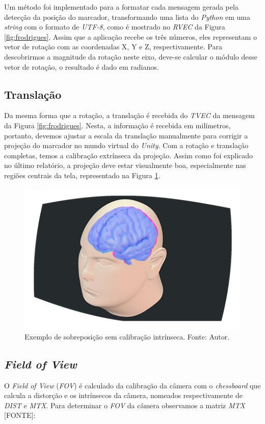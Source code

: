 Um método foi implementado para a formatar cada mensagem gerada pela detecção da posição do marcador, transformando uma lista do \textit{Python} em uma \textit{string} com o formato de \textit{UTF-8}, como é mostrado no \textit{RVEC} da Figura \ref{fig:frodrigues}. Assim que a aplicação recebe os três números, eles representam o vetor de rotação com as coordenadas X, Y e Z, respectivamente. Para descobrirmos a magnitude da rotação neste eixo, deve-se calcular o módulo desse vetor de rotação, o resultado é dado em radianos.

\subsection{Translação}

Da mesma forma que a rotação, a translação é recebida do \textit{TVEC} da mensagem da Figura \ref{fig:frodrigues}. Nesta, a informação é recebida em milímetros, portanto, devemos ajustar a escala da translação manualmente para corrigir a projeção do marcador no mundo virtual do \textit{Unity}. Com a rotação e translação completas, temos a calibração extrínseca da projeção. Assim como foi explicado no último relatório, a projeção deve estar visualmente boa, especialmente nas regiões centrais da tela, representado na Figura \ref{fig:Extrinsecos}.

\begin{figure}[ht]
    \centering
    \includegraphics[width=.45\linewidth]{figuras/CalibExtr.png}
    \caption{Exemplo de sobreposição sem calibração intrínseca. Fonte: Autor.}
    \label{fig:Extrinsecos}
\end{figure}

\subsection{\textit{Field of View}}

O \textit{Field of View} (\textit{FOV}) é calculado da calibração da câmera com o \textit{chessboard} que calcula a distorção e os intrínsecos da câmera, nomeados respectivamente de \textit{DIST} e \textit{MTX}. Para determinar o \textit{FOV} da câmera observamos a matriz \textit{MTX} [FONTE]:

